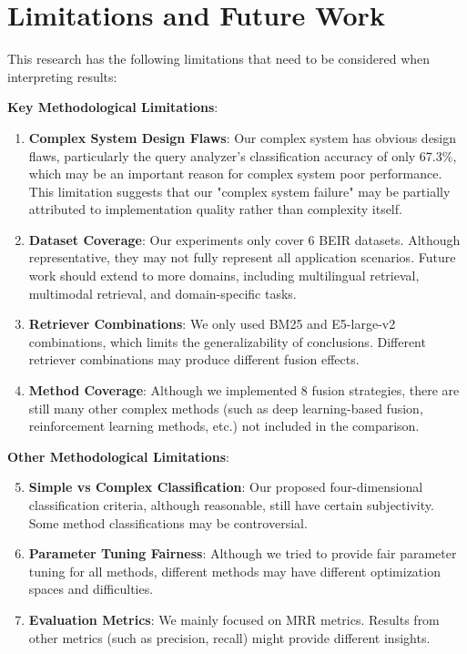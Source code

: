 \documentclass[letterpaper]{article} %
\begin{document}
\section{Limitations and Future Work}

This research has the following limitations that need to be considered when interpreting results:

\textbf{Key Methodological Limitations}:

\begin{enumerate}
\item \textbf{Complex System Design Flaws}: Our complex system has obvious design flaws, particularly the query analyzer's classification accuracy of only 67.3\%, which may be an important reason for complex system poor performance. This limitation suggests that our "complex system failure" may be partially attributed to implementation quality rather than complexity itself.

\item \textbf{Dataset Coverage}: Our experiments only cover 6 BEIR datasets. Although representative, they may not fully represent all application scenarios. Future work should extend to more domains, including multilingual retrieval, multimodal retrieval, and domain-specific tasks.

\item \textbf{Retriever Combinations}: We only used BM25 and E5-large-v2 combinations, which limits the generalizability of conclusions. Different retriever combinations may produce different fusion effects.

\item \textbf{Method Coverage}: Although we implemented 8 fusion strategies, there are still many other complex methods (such as deep learning-based fusion, reinforcement learning methods, etc.) not included in the comparison.
\end{enumerate}

\textbf{Other Methodological Limitations}:
\begin{enumerate}
\setcounter{enumi}{4}
\item \textbf{Simple vs Complex Classification}: Our proposed four-dimensional classification criteria, although reasonable, still have certain subjectivity. Some method classifications may be controversial.

\item \textbf{Parameter Tuning Fairness}: Although we tried to provide fair parameter tuning for all methods, different methods may have different optimization spaces and difficulties.

\item \textbf{Evaluation Metrics}: We mainly focused on MRR metrics. Results from other metrics (such as precision, recall) might provide different insights.
\end{enumerate}
\end{document}
